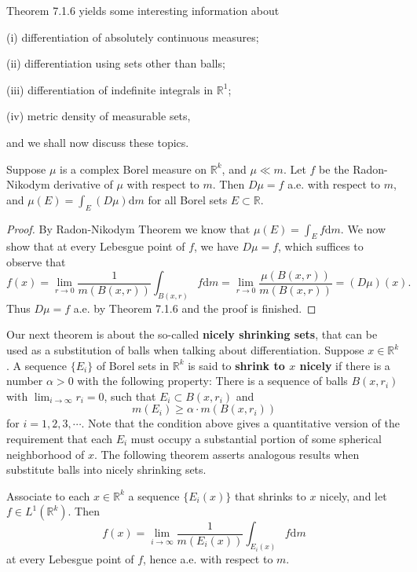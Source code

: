Theorem 7.1.6 yields some interesting information about\par
(i) differentiation of absolutely continuous measures;\par
(ii) differentiation using sets other than balls;\par
(iii) differentiation of indefinite integrals in $\mathbb{R}^1$;\par
(iv) metric density of measurable sets,\par
and we shall now discuss these topics.
\begin{theorem}
Suppose $\mu$ is a complex Borel measure on $\mathbb{R}^k$, and $\mu\ll m$. Let $f$ be the Radon-Nikodym derivative of $\mu$ with respect to $m$. Then $D\mu=f$ a.e. with respect to $m$, and $\mu(E)=\int_E(D\mu)\mathrm{d}m$ for all Borel sets $E\subset\mathbb{R}$.
\end{theorem}
\begin{proof}
By Radon-Nikodym Theorem we know that $\mu(E)=\int_Ef\mathrm{d}m$. We now show that at every Lebesgue point of $f$, we have $D\mu=f$, which suffices to observe that 
$$
f\left( x \right) =\lim_{r\rightarrow 0} \frac{1}{m\left( B\left( x,r \right) \right)}\int_{B\left( x,r \right)}{f\mathrm{d}m}=\lim_{r\rightarrow 0} \frac{\mu \left( B\left( x,r \right) \right)}{m\left( B\left( x,r \right) \right)}=\left( D\mu \right) \left( x \right) .
$$
Thus $D\mu=f$ a.e. by Theorem 7.1.6 and the proof is finished.
\end{proof}
Our next theorem is about the so-called \textbf{nicely shrinking sets}, that can be used as a substitution of balls when talking about differentiation. Suppose $x\in\mathbb{R}^k$. A sequence $\{E_i\}$ of Borel sets in $\mathbb{R}^k$ is said to \textbf{shrink to $x$ nicely} if there is a number $\alpha>0$ with the following property: There is a sequence of balls $B(x,r_i)$ with $\lim_{i\to\infty}r_i=0$, such that $E_i\subset B(x,r_i)$ and 
$$
m\left( E_i \right) \ge \alpha \cdot m\left( B\left( x,r_i \right) \right) 
$$
for $i=1,2,3,\cdots$. Note that the condition above gives a quantitative version of the requirement that each $E_i$ must occupy a substantial portion of some spherical neighborhood of $x$. The following theorem asserts analogous results when substitute balls into nicely shrinking sets.
\begin{theorem}
Associate to each $x\in\mathbb{R}^k$ a sequence $\{E_i(x)\}$ that shrinks to $x$ nicely, and let $f\in L^1(\mathbb{R}^k)$. Then 
$$
f\left( x \right) =\lim_{i\rightarrow \infty} \frac{1}{m\left( E_i\left( x \right) \right)}\int_{E_i\left( x \right)}{f\mathrm{d}m}
$$
at every Lebesgue point of $f$, hence a.e. with respect to $m$.
\end{theorem}
